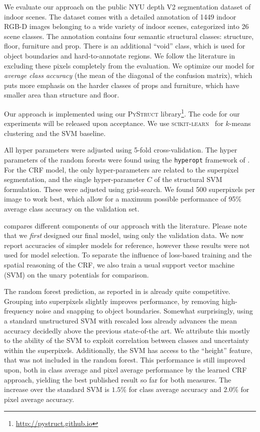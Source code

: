 We evaluate our approach on the public NYU depth V2 segmentation dataset of
indoor scenes.  The dataset comes with a detailed annotation of 1449 indoor
RGB-D images belonging to a wide variety of indoor scenes, categorized into 26
scene classes.  The annotation contains four semantic structural classes:
structure, floor, furniture and prop. There is an additional ``void'' class,
which is used for object boundaries and hard-to-annotate regions. We follow the
literature in excluding these pixels completely from the evaluation.
We optimize our model for \emph{average class accuracy} (the mean of the
diagonal of the confusion matrix), which puts more emphasis on the harder
classes of props and furniture, which have smaller area than structure and
floor.

Our approach is implemented using our \textsc{PyStruct}
library\footnote{\url{http://pystruct.github.io}}.  The code for our
experiments will be released upon acceptance. We use \textsc{scikit-learn}~\citep{pedregosa2011scikit}
for $k$-means clustering and the SVM baseline.

All hyper parameters were adjusted using 5-fold cross-validation. The
hyper parameters of the random forests were found using the \texttt{hyperopt}
framework of \cite{bergstra2011algorithms}. For the CRF model, the only
hyper-parameters are related to the superpixel segmentation, and the single
hyper-parameter $C$ of the structural SVM formulation. These were adjusted
using grid-search.
We found 500 superpixels per image to work best, which allow for a maximum
possible performance of 95\% average class accuracy on the validation set.

 compares different components of our approach with the literature.
Please note that we \emph{first} designed our final model, using only the
validation data. We now report accuracies of simpler models for reference,
however these results were not used for model selection. To separate
the influence of loss-based training and the spatial reasoning of the CRF,
we also train a usual support vector machine (SVM) on the unary potentials for comparison.

The random forest prediction, as reported in \citet{stueckler2013} is already quite competitive.
Grouping into superpixels slightly improves performance, by removing
high-frequency noise and snapping to object boundaries. Somewhat surprisingly,
using a standard unstructured SVM with rescaled loss already advances the mean
accuracy decidedly above the previous state-of-the art. We
attribute this mostly to the ability of the SVM to exploit correlation between
classes and uncertainty within the superpixels.
Additionally, the SVM has access to the ``height'' feature, that was not
included in the random forest.
This performance is still improved upon, both in class average and pixel
average performance by the learned CRF approach, yielding
the best published result so far for both measures. The increase over the
standard SVM is $1.5\%$ for class average accuracy and $2.0\%$ for pixel
average accuracy.


